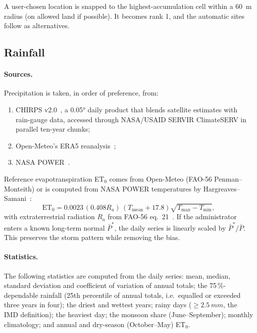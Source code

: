 \documentclass[11pt,a4paper]{article}
\begin{document}
A user-chosen location is snapped to the highest-accumulation cell within a \SI{60}{m} radius
(on allowed land if possible). It becomes rank 1, and the automatic sites follow as
alternatives.

\subsection{Rainfall}
\paragraph{Sources.} Precipitation is taken, in order of preference, from:
\begin{enumerate}
  \item CHIRPS v2.0~\cite{funk2015}, a \ang{0.05} daily product that blends satellite estimates
        with rain-gauge data, accessed through NASA/USAID SERVIR ClimateSERV in parallel
        ten-year chunks;
  \item Open-Meteo's ERA5 reanalysis~\cite{hersbach2020};
  \item NASA POWER~\cite{gelaro2017}.
\end{enumerate}
Reference evapotranspiration ET$_0$ comes from Open-Meteo (FAO-56 Penman--Monteith) or is
computed from NASA POWER temperatures by Hargreaves--Samani~\cite{hargreaves1985}:
\begin{equation}
\mathrm{ET}_0 = 0.0023\,(0.408R_a)\,(T_{\text{mean}}+17.8)\sqrt{T_{\max}-T_{\min}},
\end{equation}
with extraterrestrial radiation $R_a$ from FAO-56 eq.~21~\cite{allen1998}. If the
administrator enters a known long-term normal $\bar P^\ast$, the daily series is linearly
scaled by $\bar P^\ast/\bar P$. This preserves the storm pattern while removing the bias.

\paragraph{Statistics.} The following statistics are computed from the daily series: mean,
median, standard deviation and coefficient of variation of annual totals; the 75\,\%-dependable
rainfall (25th percentile of annual totals, i.e.\ equalled or exceeded three years in four);
the driest and wettest years; rainy days ($\geq\SI{2.5}{mm}$, the IMD definition); the heaviest
day; the monsoon share (June--September); monthly climatology; and annual and dry-season
(October--May) ET$_0$.
\end{document}
